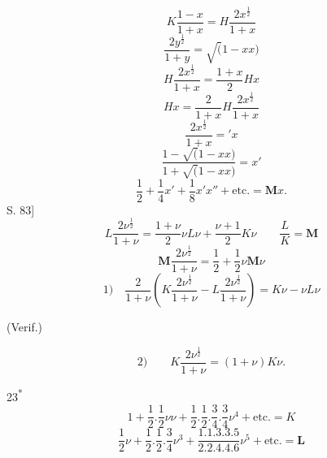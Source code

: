 \begin{equation}\tag*{[22]}K\frac{1-x}{1+x}=H\frac{2x^{\frac12}}{1+x}\end{equation}
\begin{equation}\tag*{[23]}\frac{2y^{\frac12}}{1+y}=\surd(1-xx)\end{equation}
\begin{equation}\tag*{[24]}H\frac{2x^{\frac12}}{1+x}=\frac{1+x}{2}Hx\end{equation}
\begin{equation}\tag*{[25]}Hx=\frac2{1+x}H\frac{2x^{\frac12}}{1+x}\end{equation}
\begin{equation}\tag*{[26]}\frac{2x^{\frac12}}{1+x}={}'x\end{equation}
\begin{equation}\tag*{[27]}\frac{1-\surd(1-xx)}{1+\surd(1-xx)}=x'\end{equation}
\begin{equation}\tag*{[28]}\frac12+\frac14x'+\frac18x'x''+\text{etc.}=\mathbf{M}x.\end{equation}
\ClosingRule
{}
\noindent S. 83]
\begin{equation}\tag*{[29]}L\frac{2\nu^{\frac12}}{1+\nu}=\frac{1+\nu}{2}\nu L\nu+\frac{\nu+1}{2}K\nu\qquad\frac LK=\mathbf M\end{equation}
\begin{equation}\tag*{[30]}\mathbf M\frac{2\nu^{\frac12}}{1+\nu}=\frac12+\frac12\nu\mathbf M\nu\end{equation}
\begin{equation}\tag*{[31]}1)\quad\frac2{1+\nu}\left(K\frac{2\nu^{\frac12}}{1+\nu}-L\frac{2\nu^{\frac12}}{1+\nu}\right)=K\nu-\nu L\nu\end{equation}
\begin{flushright}(Verif.)\end{flushright}
\begin{equation}\tag*{[32]}2)\qquad K\frac{2\nu^{\frac12}}{1+\nu}=(1+\nu)K\nu.\end{equation}
\ClosingRule
\par\vfill\hfill23\textsuperscript{*}
\clearpage
{}
\noindent [S. 88]
\begin{equation}\tag*{[33]}1+\frac12.\frac12\nu\nu+\frac12.\frac12.\frac34.\frac34\nu^4+\text{etc.}=K\end{equation}
\begin{equation}\tag*{[34]}\frac12\nu+\frac12.\frac12.\frac34\nu^3+\frac{1.1.3.3.5}{2.2.4.4.6}\nu^5+\text{etc.}=\mathbf L\end{equation}

